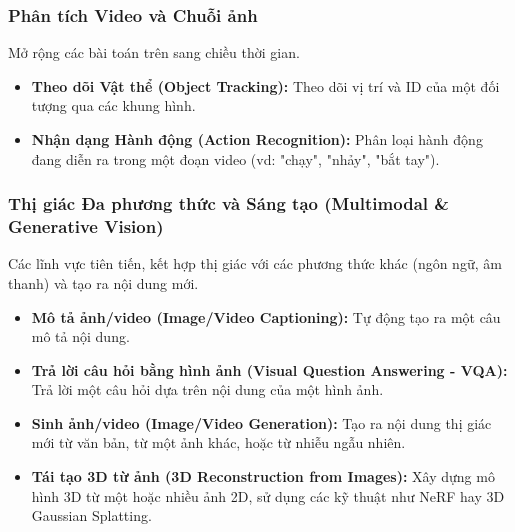\subsubsection{Phân tích Video và Chuỗi ảnh}
Mở rộng các bài toán trên sang chiều thời gian.
\begin{itemize}
    \item \textbf{Theo dõi Vật thể (Object Tracking):} Theo dõi vị trí và ID của một đối tượng qua các khung hình.
    \item \textbf{Nhận dạng Hành động (Action Recognition):} Phân loại hành động đang diễn ra trong một đoạn video (vd: "chạy", "nhảy", "bắt tay").
\end{itemize}

\subsubsection{Thị giác Đa phương thức và Sáng tạo (Multimodal \& Generative Vision)}
Các lĩnh vực tiên tiến, kết hợp thị giác với các phương thức khác (ngôn ngữ, âm thanh) và tạo ra nội dung mới.
\begin{itemize}
    \item \textbf{Mô tả ảnh/video (Image/Video Captioning):} Tự động tạo ra một câu mô tả nội dung.
    \item \textbf{Trả lời câu hỏi bằng hình ảnh (Visual Question Answering - VQA):} Trả lời một câu hỏi dựa trên nội dung của một hình ảnh.
    \item \textbf{Sinh ảnh/video (Image/Video Generation):} Tạo ra nội dung thị giác mới từ văn bản, từ một ảnh khác, hoặc từ nhiễu ngẫu nhiên.
    \item \textbf{Tái tạo 3D từ ảnh (3D Reconstruction from Images):} Xây dựng mô hình 3D từ một hoặc nhiều ảnh 2D, sử dụng các kỹ thuật như NeRF \cite{Mildenhall2020} hay 3D Gaussian Splatting.
\end{itemize}

